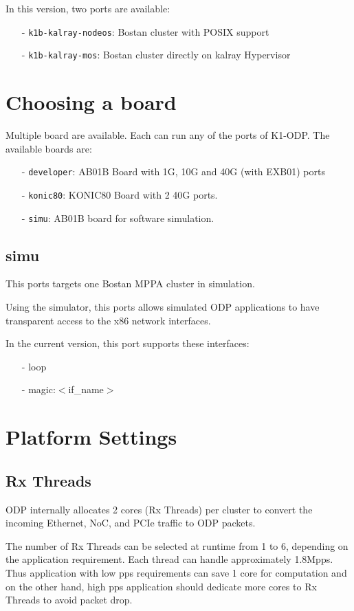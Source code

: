 \documentclass{trkalray}
\begin{document}
In this version, two ports are available:
\begin{itemize}
\item[-]{\texttt{k1b-kalray-nodeos}: Bostan cluster with POSIX support}
\item[-]{\texttt{k1b-kalray-mos}: Bostan cluster directly on kalray Hypervisor}
\end{itemize}

\section{Choosing a board}

Multiple board are available. Each can run any of the ports of K1-ODP.
The available boards are:
\begin{itemize}
\item[-]{\texttt{developer}: AB01B Board with 1G, 10G and 40G (with EXB01) ports }
\item[-]{\texttt{konic80}: KONIC80 Board with 2 40G ports.}
\item[-]{\texttt{simu}: AB01B board for software simulation.}
\end{itemize}

\subsection{simu}

This ports targets one Bostan MPPA cluster in simulation.

Using the simulator, this ports allows simulated ODP applications to
have transparent access to the x86 network interfaces.

In the current version, this port supports these interfaces:
\begin{itemize}
\item[-]{loop}
\item[-]{magic:$<$if\_name$>$}
\end{itemize}

\newpage
\section{Platform Settings}
\subsection{Rx Threads}
ODP internally allocates 2 cores (Rx Threads) per cluster to convert the incoming
Ethernet, NoC, and PCIe traffic to ODP packets.

The number of Rx Threads can be selected at runtime from 1 to 6,
depending on the application requirement. Each thread can handle
approximately 1.8Mpps. Thus application with low pps requirements can
save 1 core for computation and on the other hand, high pps
application should dedicate more cores to Rx Threads to avoid packet
drop.
\end{document}
